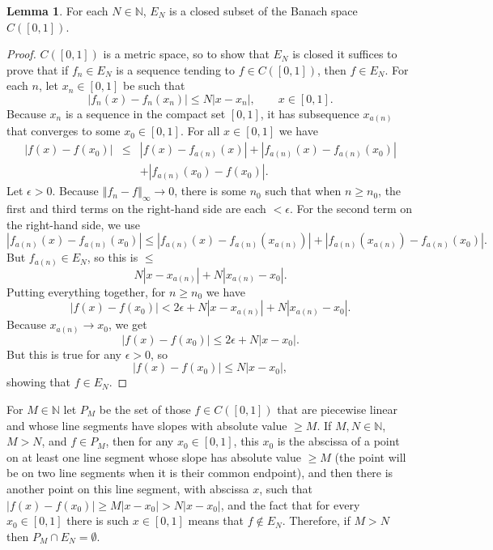 \documentclass{article}
\newcommand{\norm}[1]{\left\Vert #1 \right\Vert}
\theoremstyle{definition}
\newtheorem{lemma}[theorem]{Lemma}
\theoremstyle{definition}
\begin{document}
\begin{lemma}
For each $N \in \mathbb{N}$, $E_N$ is a closed subset of the Banach space $C([0,1])$. 
\end{lemma}
\begin{proof}
$C([0,1])$ is a metric space, so to show that  $E_N$ is closed it suffices to prove that if $f_n \in E_N$ is a sequence tending to $f \in C([0,1])$, then $f \in E_N$. 
For each $n$, let $x_n \in [0,1]$ be such that
\[
|f_n(x)-f_n(x_n)| \leq N|x-x_n|, \qquad x \in [0,1].
\]
Because $x_n$ is a sequence in the compact set $[0,1]$, it has subsequence $x_{a(n)}$ that converges to some $x_0 \in [0,1]$. 
For all $x \in [0,1]$ we have
\begin{eqnarray*}
|f(x)-f(x_0)|&\leq&|f(x)-f_{a(n)}(x)|+|f_{a(n)}(x)-f_{a(n)}(x_0)|\\
&&+|f_{a(n)}(x_0)-f(x_0)|.
\end{eqnarray*}
Let $\epsilon>0$. Because $\norm{f_n-f}_\infty \to 0$, there is some $n_0$ such that when $n \geq n_0$, the first and third terms on the right-hand side
are each $<\epsilon$. For the second term on the right-hand side, we use
\[
|f_{a(n)}(x)-f_{a(n)}(x_0)| \leq |f_{a(n)}(x)-f_{a(n)}(x_{a(n)})| + |f_{a(n)}(x_{a(n)})-f_{a(n)}(x_0)|.
\]
But $f_{a(n)} \in E_N$, so this is $\leq$
\[
N|x-x_{a(n)}| + N|x_{a(n)}-x_0|.
\]
Putting everything together, for $n \geq n_0$ we have
\[
|f(x)-f(x_0)| < 2\epsilon + N|x-x_{a(n)}| + N|x_{a(n)}-x_0|.
\]
Because $x_{a(n)} \to x_0$, we get
\[
|f(x)-f(x_0)| \leq 2\epsilon + N|x-x_0|.
\]
But this is true for any $\epsilon>0$, so
\[
|f(x)-f(x_0)| \leq N|x-x_0|,
\]
showing that $f \in E_N$.
\end{proof}

For $M \in \mathbb{N}$  let $P_M$ be the set of those $f \in C([0,1])$ that are piecewise linear and whose line segments have slopes
with absolute value $\geq M$. If $M, N \in \mathbb{N}$, $M>N$, and $f \in P_M$, then for any $x_0 \in [0,1]$, this $x_0$ is the abscissa of a point
on at least one line segment whose
slope has absolute value $\geq M$ (the point will be on two line segments when it is their common endpoint), and then there is another point on this line segment,
with abscissa $x$, such that $|f(x)-f(x_0)| \geq M|x-x_0|>N|x-x_0|$, and the fact that for every $x_0 \in [0,1]$ there is such $x \in [0,1]$ means that
$f \not \in E_N$. Therefore, if $M>N$ then $P_M \cap E_N = \emptyset$. 
\end{document}
